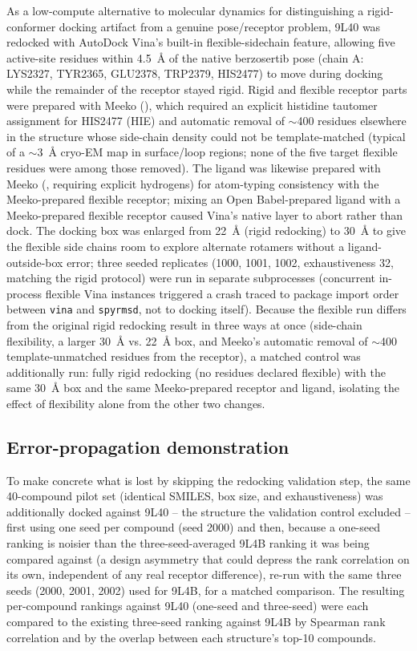 \documentclass[11pt]{article}
\begin{document}
As a low-compute alternative to molecular dynamics for distinguishing a
rigid-conformer docking artifact from a genuine pose/receptor problem, 9L40
was redocked with AutoDock Vina's built-in flexible-sidechain feature,
allowing five active-site residues within 4.5~{\AA} of the native
berzosertib pose (chain A: LYS2327, TYR2365, GLU2378, TRP2379, HIS2477) to
move during docking while the remainder of the receptor stayed rigid.
Rigid and flexible receptor parts were prepared with Meeko
(), which required an explicit histidine
tautomer assignment for HIS2477 (HIE) and automatic removal of $\sim$400
residues elsewhere in the structure whose side-chain density could not be
template-matched (typical of a $\sim$3~{\AA} cryo-EM map in surface/loop
regions; none of the five target flexible residues were among those
removed). The ligand was likewise prepared with Meeko
(, requiring explicit hydrogens) for
atom-typing consistency with the Meeko-prepared flexible receptor; mixing
an Open Babel-prepared ligand with a Meeko-prepared flexible receptor caused
Vina's native layer to abort rather than dock. The docking box was
enlarged from 22~{\AA} (rigid redocking) to 30~{\AA} to give the flexible
side chains room to explore alternate rotamers without a
ligand-outside-box error; three seeded replicates (1000, 1001, 1002,
exhaustiveness 32, matching the rigid protocol) were run in separate
subprocesses (concurrent in-process flexible Vina instances triggered a
crash traced to package import order between \texttt{vina} and
\texttt{spyrmsd}, not to docking itself). Because the flexible run
differs from the original rigid redocking result in three ways at once
(side-chain flexibility, a larger 30~{\AA} vs. 22~{\AA} box, and Meeko's
automatic removal of $\sim$400 template-unmatched residues from the
receptor), a matched control was additionally run: fully rigid redocking
(no residues declared flexible) with the same 30~{\AA} box and the same
Meeko-prepared receptor and ligand, isolating the effect of flexibility
alone from the other two changes.

\subsection*{Error-propagation demonstration}

To make concrete what is lost by skipping the redocking validation step,
the same 40-compound pilot set (identical SMILES, box size, and
exhaustiveness) was additionally docked against 9L40 -- the structure the
validation control excluded -- first using one seed per compound (seed
2000) and then, because a one-seed ranking is noisier than the
three-seed-averaged 9L4B ranking it was being compared against (a design
asymmetry that could depress the rank correlation on its own, independent
of any real receptor difference), re-run with the same three seeds
(2000, 2001, 2002) used for 9L4B, for a matched comparison. The resulting
per-compound rankings against 9L40 (one-seed and three-seed) were each
compared to the existing three-seed ranking against 9L4B by Spearman rank
correlation and by the overlap between each structure's top-10 compounds.
\end{document}
